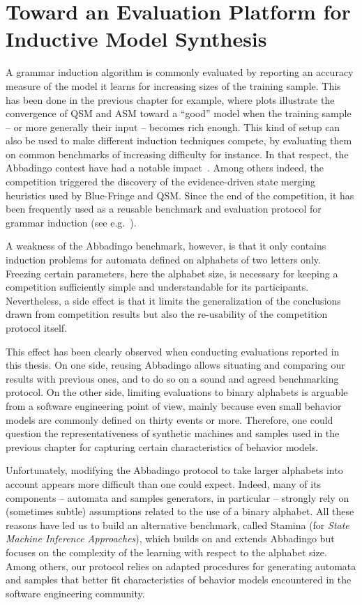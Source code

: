 \chapter{Toward an Evaluation Platform for Inductive Model Synthesis\label{chapter:stamina}}

A grammar induction algorithm is commonly evaluated by reporting an accuracy measure of the model it learns for increasing sizes of the training sample. This has been done in the previous chapter for example, where plots illustrate the convergence of QSM and ASM toward a ``good'' model when the training sample -- or more generally their input -- becomes rich enough. This kind of setup can also be used to make different induction techniques compete, by evaluating them on common benchmarks of increasing difficulty for instance. In that respect, the Abbadingo contest have had a notable impact~\cite{Lang:1998}. Among others indeed, the competition triggered the discovery of the evidence-driven state merging heuristics used by Blue-Fringe and QSM. Since the end of the competition, it has been frequently used as a reusable benchmark and evaluation protocol for grammar induction (see e.g.~\cite{Lucas:2003, Bongard:2005, Lucas:2005, Adriaans:2006, Dupont:2008, Lambeau:2008, Heule:2010}).

A weakness of the Abbadingo benchmark, however, is that it only contains induction problems for automata defined on alphabets of two letters only. Freezing certain parameters, here the alphabet size, is necessary for keeping a competition sufficiently simple and understandable for its participants. Nevertheless, a side effect is that it limits the generalization of the conclusions drawn from competition results but also the re-usability of the competition protocol itself. 

This effect has been clearly observed when conducting evaluations reported in this thesis. On one side, reusing Abbadingo allows situating and comparing our results with previous ones, and to do so on a sound and agreed benchmarking protocol. On the other side, limiting evaluations to binary alphabets is arguable from a software engineering point of view, mainly because even small behavior models are commonly defined on thirty events or more. Therefore, one could question the representativeness of synthetic machines and samples used in the previous chapter for capturing certain characteristics of behavior models. 

Unfortunately, modifying the Abbadingo protocol to take larger alphabets into account appears more difficult than one could expect. Indeed, many of its components -- automata and samples generators, in particular -- strongly rely on (sometimes subtle) assumptions related to the use of a binary alphabet. All these reasons have led us to build an alternative benchmark, called Stamina (for \emph{State Machine Inference Approaches}), which builds on and extends Abbadingo but focuses on the complexity of the learning with respect to the alphabet size. Among others, our protocol relies on adapted procedures for generating automata and samples that better fit characteristics of behavior models encountered in the software engineering community.

